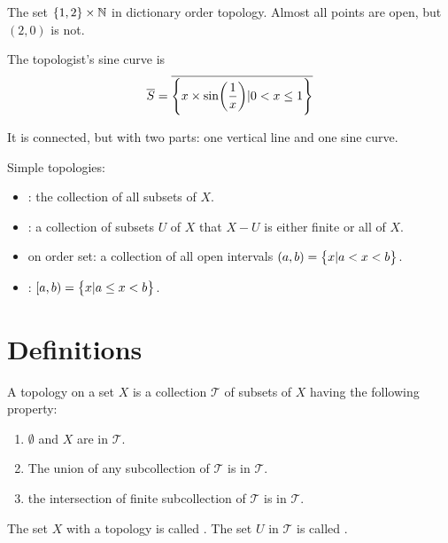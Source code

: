 \begin{definition}
    The set $\set{1,2} \times \mathbb{N}$ in dictionary order topology. Almost all points are open, but $(2,0)$ is not.
\end{definition}

\begin{definition}\label{topologist_sine_curve}
    The topologist's sine curve is
    \begin{equation}
        \closure{S} = \closure{\set{x \times \sin \mleft(\frac{1}{x} \mright) | 0 < x \leq 1}}
    \end{equation}
    
    It is connected, but with two parts: one vertical line and one sine curve.
\end{definition}


\begin{example}
    Simple topologies:
\begin{itemize}
    \item {}: the collection of all subsets of $X$.
    \item {}: a collection of subsets $U$ of $X$ that $X - U$ is either finite or all of $X$.
    \item {} on order set: a collection of all open intervals $(a,b) = \set{x | a < x < b}$.
    \item {} : $[a,b) = \set{x | a \leq x < b}$.
\end{itemize}
\end{example}




\section{Definitions}

\begin{definition}
    A topology on a set $X$ is a collection $\mathcal{T}$ of subsets of $X$ having the following property:
    \begin{enumerate}
        \item $\emptyset$ and $X$ are in $\mathcal{T}$.
        \item The union of any subcollection of $\mathcal{T}$ is in $\mathcal{T}$.
        \item the intersection of finite subcollection of $\mathcal{T}$ is in $\mathcal{T}$.
    \end{enumerate}

The set $X$ with a topology is called . The set $U$ in $\mathcal{T}$ is called .
\end{definition}

